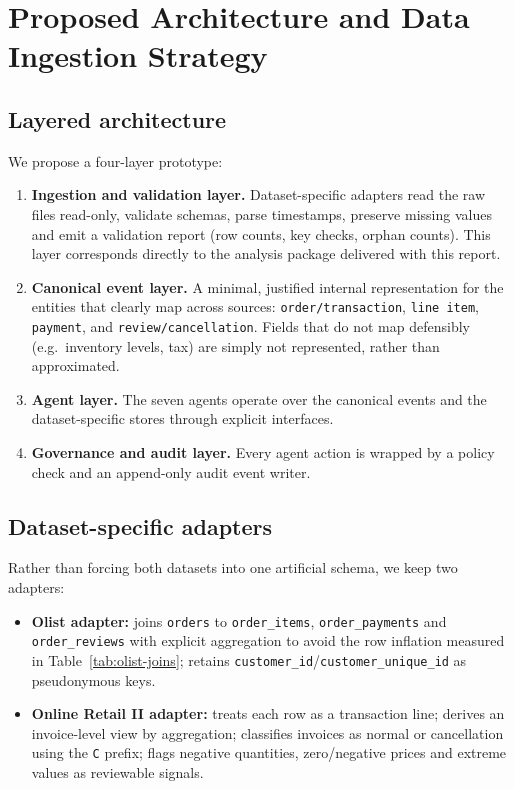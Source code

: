 \documentclass[11pt,a4paper]{article}
\newcommand{\code}[1]{\texttt{#1}}
\begin{document}
\section{Proposed Architecture and Data Ingestion Strategy}
\subsection{Layered architecture}
We propose a four-layer prototype:
\begin{enumerate}
\item \textbf{Ingestion and validation layer.} Dataset-specific adapters read the raw files read-only, validate schemas, parse timestamps, preserve missing values and emit a validation report (row counts, key checks, orphan counts). This layer corresponds directly to the analysis package delivered with this report.
\item \textbf{Canonical event layer.} A minimal, justified internal representation for the entities that clearly map across sources: \code{order/transaction}, \code{line item}, \code{payment}, and \code{review/cancellation}. Fields that do not map defensibly (e.g.\ inventory levels, tax) are simply not represented, rather than approximated.
\item \textbf{Agent layer.} The seven agents operate over the canonical events and the dataset-specific stores through explicit interfaces.
\item \textbf{Governance and audit layer.} Every agent action is wrapped by a policy check and an append-only audit event writer.
\end{enumerate}

\subsection{Dataset-specific adapters}
Rather than forcing both datasets into one artificial schema, we keep two adapters:
\begin{itemize}
\item \textbf{Olist adapter:} joins \code{orders} to \code{order\_items}, \code{order\_payments} and \code{order\_reviews} with explicit aggregation to avoid the row inflation measured in Table~\ref{tab:olist-joins}; retains \code{customer\_id}/\code{customer\_unique\_id} as pseudonymous keys.
\item \textbf{Online Retail II adapter:} treats each row as a transaction line; derives an invoice-level view by aggregation; classifies invoices as normal or cancellation using the \code{C} prefix; flags negative quantities, zero/negative prices and extreme values as reviewable signals.
\end{itemize}
\end{document}
